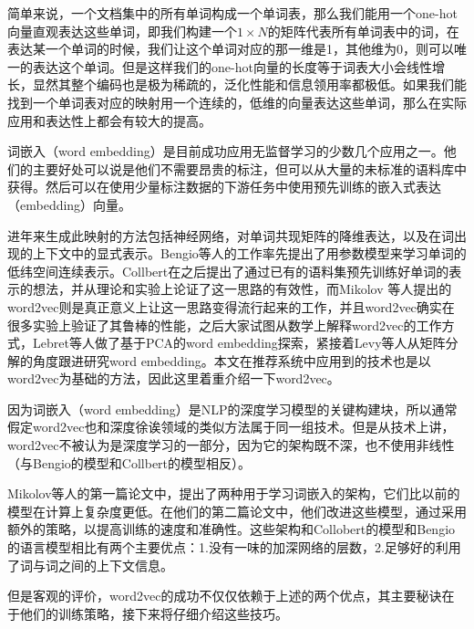 简单来说，一个文档集中的所有单词构成一个单词表，那么我们能用一个one-hot向量直观表达这些单词，即我们构建一个$1 \times N$的矩阵代表所有单词表中的词，在表达某一个单词的时候，我们让这个单词对应的那一维是1，其他维为0，则可以唯一的表达这个单词。但是这样我们的one-hot向量的长度等于词表大小会线性增长，显然其整个编码也是极为稀疏的，泛化性能和信息领用率都极低。如果我们能找到一个单词表对应的映射用一个连续的，低维的向量表达这些单词，那么在实际应用和表达性上都会有较大的提高。

词嵌入（word embedding）是目前成功应用无监督学习的少数几个应用之一。他们的主要好处可以说是他们不需要昂贵的标注，但可以从大量的未标准的语料库中获得。然后可以在使用少量标注数据的下游任务中使用预先训练的嵌入式表达（embedding）向量。

进年来生成此映射的方法包括神经网络\cite{BengioDV00,CollobertW08,mikolov2013distributed}，对单词共现矩阵的降维表达\cite{MFw2v,PCAw2v,EMFw2v}，以及在词出现的上下文中的显式表示\cite{levy2014linguistic}。Bengio等人的工作\cite{BengioDV00}率先提出了用参数模型来学习单词的低纬空间连续表示。Collbert\cite{CollobertW08}在之后提出了通过已有的语料集预先训练好单词的表示的想法，并从理论和实验上论证了这一思路的有效性，而Mikolov 等人提出的word2vec\cite{mikolov2013distributed}则是真正意义上让这一思路变得流行起来的工作，并且word2vec确实在很多实验上验证了其鲁棒的性能，之后大家试图从数学上解释word2vec的工作方式，Lebret等人做了基于PCA\cite{PCAw2v}的word embedding探索，紧接着Levy等人\cite{MFw2v}从矩阵分解的角度跟进研究word embedding。本文在推荐系统中应用到的技术也是以word2vec为基础的方法，因此这里着重介绍一下word2vec。

因为词嵌入（word embedding）是NLP的深度学习模型的关键构建块，所以通常假定word2vec也和深度徐诶领域的类似方法属于同一组技术。但是从技术上讲，word2vec不被认为是深度学习的一部分，因为它的架构既不深，也不使用非线性（与Bengio的模型\cite{BengioDV00}和Collbert的模型\cite{CollobertW08}相反）。

Mikolov等人的第一篇论文\cite{word2vec}中，提出了两种用于学习词嵌入的架构，它们比以前的模型在计算上复杂度更低。在他们的第二篇论文\cite{mikolov2013distributed}中，他们改进这些模型，通过采用额外的策略，以提高训练的速度和准确性。这些架构和Collobert的模型和Bengio的语言模型相比有两个主要优点：1.没有一味的加深网络的层数，2.足够好的利用了词与词之间的上下文信息。

但是客观的评价，word2vec的成功不仅仅依赖于上述的两个优点，其主要秘诀在于他们的训练策略，接下来将仔细介绍这些技巧。

